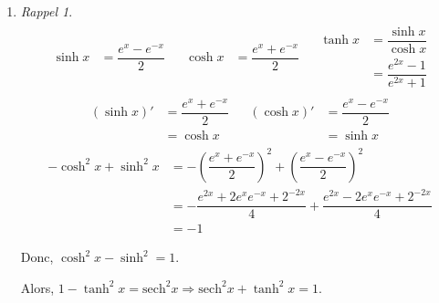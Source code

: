 \documentclass{report}
\newcommand*{\sech}{\mathrm{sech}}
\theoremstyle{definition}
\theoremstyle{remark}
\newtheorem*{exem}{Exemple}
\newtheorem*{rapp}{Rappel}
\begin{document}
\begin{enumerate}
		On pose $x=a\sin t$. On a $dx=a\cos t dt$.
		\begin{exem}
			\begin{align*}
				\int x^2\sqrt{a^2-x^2} dx&= \int a^2\sin^2t \sqrt{a^2-a^2\sin^2t} a\cos t dt\\
				&= \int a^4 \sin^2t \cos^2 t dt\\
				&= \int a^4 \dfrac{1}{4} \sin^2 2t dt\\
				&= \int \dfrac{a^4}{4} \cdot \dfrac{1-\cos 4t}{2} dt\\
				&= \dfrac{a^4}{8} \left[ t - \dfrac{\sin 4t}{4} \right]
			\end{align*}
		\end{exem}
		\newpage
		\item
		\begin{rapp}
			\begin{align*}
				\begin{split}
					\sinh x&= \dfrac{e^x-e^{-x}}{2}
				\end{split}
				&
				\begin{split}
					\cosh x&= \dfrac{e^x+e^{-x}}{2}
				\end{split}
				&
				\begin{split}
					\tanh x&= \dfrac{\sinh x}{\cosh x}\\
					&= \dfrac{e^{2x}-1}{e^{2x}+1}
				\end{split}
			\end{align*}
			\begin{align*}
				\begin{split}
					(\sinh x)'&= \dfrac{e^x+e^{-x}}{2}\\
					&= \cosh x
				\end{split}
				&
				\begin{split}
					(\cosh x)'&= \dfrac{e^x-e^{-x}}{2}\\
					&= \sinh x
				\end{split}
			\end{align*}
			\begin{align*}
					-\cosh^2x+\sinh^2x&= -\left( \dfrac{e^x+e^{-x}}{2} \right)^2 + \left( \dfrac{e^x-e^{-x}}{2} \right)^2\\
					&= -\dfrac{e^{2x}+2e^xe^{-x}+2^{-2x}}{4} + \dfrac{e^{2x}-2e^xe^{-x}+2^{-2x}}{4}\\
					&= -1
			\end{align*}

			Donc, $\cosh^2x-\sinh^2=1$.

			Alors, $1-\tanh^2x = \sech^2x \Rightarrow \sech^2x+\tanh^2x = 1$.


\end{rapp}
\end{enumerate}
\end{document}
